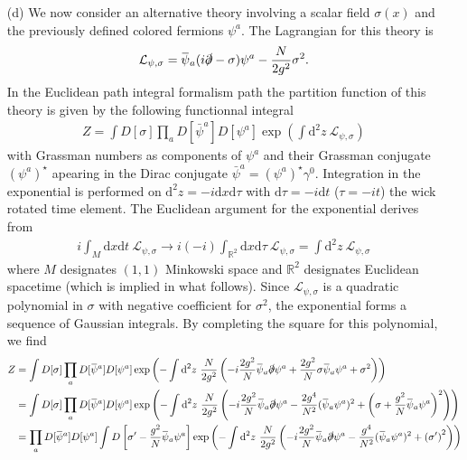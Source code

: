 \documentclass[10pt, a4paper]{article}
\begin{document}
\begin{enumerate}
  \item[(d)] We now consider an alternative theory involving a scalar field $\sigma(x)$ and the previously defined colored fermions $\psi^a$. The Lagrangian for this theory is
  \begin{align*}
    \mathcal{L}_{\psi, \sigma} = \bar{\psi}_a(i\slashed{\partial}-\sigma) \psi^a-\frac{N}{2 g^2} \sigma^2. 
  \end{align*} 
  In the Euclidean path integral formalism path the partition function of this theory is given by the following functionnal integral
  \begin{align*}
    Z = \int D[\sigma] \prod_{a} D[\bar{\psi}^a] D[\psi^a] \exp\left(\int \text{d}^2 z \ \mathcal{L}_{\psi, \sigma} \right)
  \end{align*} 
  with Grassman numbers as components of $\psi^a$ and their Grassman conjugate $(\psi^a)^\star$ apearing in the Dirac conjugate $\bar{\psi}^a = (\psi^a)^\star \gamma^0$. Integration in the exponential is performed on $\text{d}^2 z = -i\text{d}x \text{d}\tau$ with $\text{d}\tau = -i\text{d}t$ ($\tau = - i t$) the wick rotated time element. The Euclidean argument for the exponential derives from  
  \begin{align*}
    i \int_{M} \text{d} x \text{d} t  \ \mathcal{L}_{\psi, \sigma} \to  i(-i) \int_{\mathbb{R}^2} \text{d} x \text{d} \tau \ \mathcal{L}_{\psi, \sigma} = \int \text{d}^2 z \ \mathcal{L}_{\psi, \sigma} 
  \end{align*}
  where $M$ designates $(1, 1)$ Minkowski space and $\mathbb{R}^2$ designates Euclidean spacetime (which is implied in what follows). Since $\mathcal{L}_{\psi, \sigma}$ is a quadratic polynomial in $\sigma$ with negative coefficient for $\sigma^2$, the exponential forms a sequence of Gaussian integrals. By completing the square for this polynomial, we find 
  \begin{align*}
    Z &= \int D[\sigma] \prod_{a} D[\bar{\psi}^a] D[\psi^a] \exp\left(-\int \text{d}^2 z \ \frac{N}{2 g^2}\left(-i\frac{2 g^2}{N}\bar{\psi}_a\slashed{\partial}\psi^a+\frac{2 g^2}{N}\sigma \bar{\psi}_a \psi^a  + \sigma^2\right)\right)\\
    &=\int D[\sigma] \prod_{a} D[\bar{\psi}^a] D[\psi^a] \exp\left(-\int \text{d}^2 z \ \frac{N}{2 g^2}\left(-i\frac{2 g^2}{N}\bar{\psi}_a\slashed{\partial}\psi^a-\frac{2 g^4}{N^2} (\bar{\psi}_a \psi^a)^2  + \left(\sigma + \frac{g^2}{N} \bar{\psi}_a \psi^a\right)^2\right)\right)\\
    &= \prod_{a} D[\bar{\psi}^a] D[\psi^a] \int D\left[\sigma' - \frac{g^2}{N} \bar{\psi}_a \psi^a\right] \exp\left(-\int \text{d}^2 z \ \frac{N}{2 g^2}\left(-i\frac{2 g^2}{N}\bar{\psi}_a\slashed{\partial}\psi^a-\frac{g^4}{N^2} (\bar{\psi}_a \psi^a)^2  + \left(\sigma'\right)^2\right)\right)\\

\end{align*}
\end{enumerate}
\end{document}
